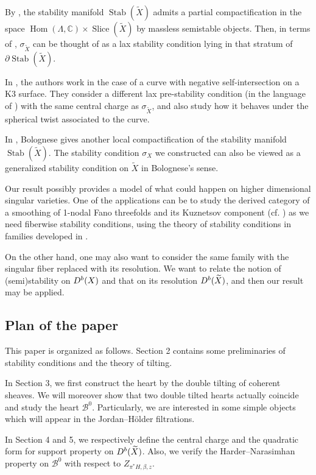 \documentclass[12pt]{amsart}
\theoremstyle{definition}
\DeclareMathOperator{\Hom}{Hom}
\DeclareMathOperator{\Slice}{Slice}
\DeclareMathOperator{\Stab}{Stab}
\begin{document}
By \cite{BPPW22}, the stability manifold $\Stab(\widetilde{X})$ admits a partial compactification in the space $\Hom(\Lambda, \mathbb{C})  \times  \Slice(\widetilde{X})$ by massless semistable objects.
Then, in terms of \cite{BPPW22}, $\sigma_{\widetilde{X}}$ can be thought of as a lax stability condition lying in that stratum of $\partial\Stab(\widetilde{X})$.

In \cite{CLSY24}, the authors work in the case of a curve with negative self-intersection on a K3 surface. They consider a different lax pre-stability condition (in the language of \cite{BPPW22}) with the same central charge as $\sigma_{\widetilde {X}}$,  and also study how it behaves under the spherical twist associated to the curve.

In \cite{Bol23}, Bolognese gives another local compactification of the stability manifold $\Stab(\widetilde{X})$.
The stability condition $\sigma_X$ we constructed can also be viewed as a generalized stability condition on $\widetilde{X}$ in Bolognese's sense. 


Our result possibly provides a model of what could happen on higher dimensional singular varieties.
One of the applications can be to study the derived category of a smoothing of 1-nodal Fano threefolds and its Kuznetsov component (cf. \cite{KS24}) as we need fiberwise stability conditions, using the theory of stability conditions in families developed 
in \cite{BLM+}.

On the other hand, one may also want to consider the same family with the singular fiber replaced with its resolution.
We want to relate the notion of (semi)stability on ${\rm D^b}(X)$ and that on its resolution ${\rm D}^b(\widetilde{X})$,
and then our result may be applied. 



\subsection{Plan of the paper}
This paper is organized as follows. Section 2 contains some preliminaries of stability conditions and the theory of tilting.

In Section 3, we first construct the heart by the double tilting of coherent sheaves.
We will moreover show that two double tilted hearts actually coincide and study the heart $\mathcal{B}^0$.
Particularly, we are interested in some simple objects which will appear in the Jordan--Hölder filtrations.

In Section 4 and 5, we respectively define the central charge and the quadratic form for support property on ${\rm D}^b(\widetilde{X})$.
Also, we verify the Harder--Narasimhan property on $\mathcal{B}^0$ with respect to $Z_{\pi^\ast H,\beta,z}$.
\end{document}
